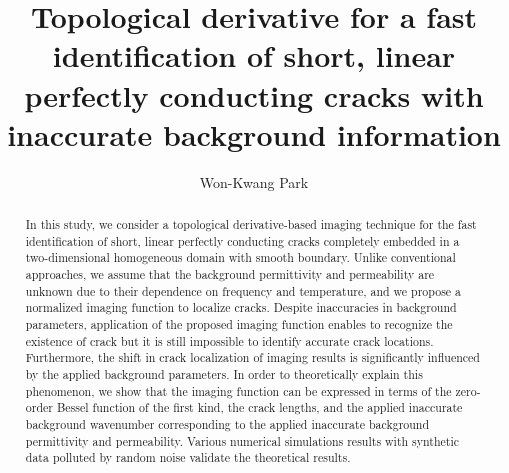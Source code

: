 \documentclass[a4,10pt]{article}
\theoremstyle{plain}
\theoremstyle{remark}
\begin{document}
\title{Topological derivative for a fast identification of short, linear perfectly conducting cracks with inaccurate background information}
\author{Won-Kwang Park}
\date{}
\maketitle
\begin{abstract}
In this study, we consider a topological derivative-based imaging technique for the fast identification of short, linear perfectly conducting cracks completely embedded in a two-dimensional homogeneous domain with smooth boundary. Unlike conventional approaches, we assume that the background permittivity and permeability are unknown due to their dependence on frequency and temperature, and we propose a normalized imaging function to localize cracks. Despite inaccuracies in background parameters, application of the proposed imaging function enables to recognize the existence of crack but it is still impossible to identify accurate crack locations. Furthermore, the shift in crack localization of imaging results is significantly influenced by the applied background parameters. In order to theoretically explain this phenomenon, we show that the imaging function can be expressed in terms of the zero-order Bessel function of the first kind, the crack lengths, and the applied inaccurate background wavenumber corresponding to the applied inaccurate background permittivity and permeability. Various numerical simulations results with synthetic data polluted by random noise validate the theoretical results.
\end{abstract}
\end{document}
